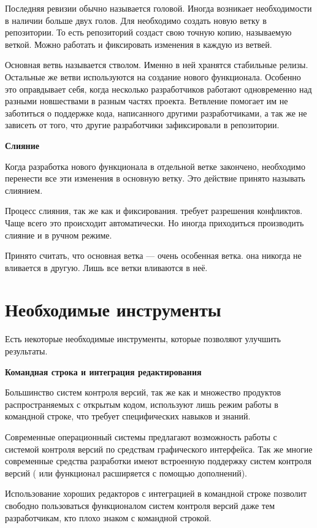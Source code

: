   Последняя ревизии обычно называется головой. Иногда возникает необходимости в наличии больше двух голов. Для необходимо создать новую ветку в репозитории. То есть репозиторий создаст свою точную копию, называемую веткой. Можно работать и фиксировать изменения в каждую из ветвей.
  
Основная ветвь называется стволом. Именно в ней хранятся стабильные релизы. Остальные же ветви используются на создание нового функционала. Особенно это оправдывает себя, когда несколько разработчиков работают одновременно над разными новшествами в разным частях проекта. Ветвление помогает им не заботиться о поддержке кода, написанного другими разработчиками, а так же не зависеть от того, что другие разработчики зафиксировали в репозитории.

  \textbf{ Слияние } %
  
  Когда разработка нового функционала в отдельной ветке закончено, необходимо перенести все эти изменения в основную ветку. Это действие принято называть слиянием.
  
 
 Процесс слияния, так же как и фиксирования. требует  разрешения конфликтов. Чаще всего это происходит автоматически. Но иногда приходиться производить слияние и в ручном режиме.

Принято считать, что основная ветка --- очень особенная ветка. она никогда не вливается в другую. Лишь все ветки вливаются в неё.


\section{ Необходимые инструменты} \label{sect2_3}

Есть некоторые необходимые инструменты, которые позволяют улучшить результаты.

\textbf{ Командная строка и интеграция редактирования } %

Большинство систем контроля версий, так же как и множество продуктов распространяемых с открытым кодом, используют лишь режим работы в командной строке, что требует специфических навыков и знаний.

Современные операционный системы предлагают возможность работы с системой контроля версий по средствам графического интерфейса. Так же многие современные средства разработки имеют встроенную поддержку систем контроля версий ( или функционал расширяется с помощью дополнений).

Использование хороших редакторов  с интеграцией в командной строке позволит свободно пользоваться функционалом систем контроля версий даже тем разработчикам, кто плохо знаком с командной строкой.

